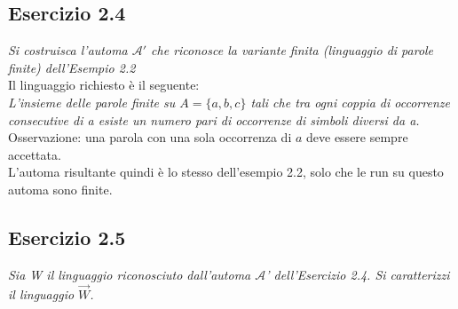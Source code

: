 \documentclass[12pt]{article}
\newcommand{\A}{\ensuremath{\mathcal{A}}\xspace}
\begin{document}
\subsection*{Esercizio 2.4}
\textit{Si costruisca l'automa $\A'$ che riconosce la variante finita (linguaggio di parole finite) dell'Esempio 2.2}\\
Il linguaggio richiesto è il seguente:\\
\textit{L'insieme delle parole finite su $A=\{a,b,c\}$ tali che tra ogni
coppia di occorrenze consecutive di a esiste un numero pari di occorrenze di simboli diversi da a.}\\
Osservazione: una parola con una sola occorrenza di $a$ deve essere sempre accettata.\\
L'automa risultante quindi è lo stesso dell'esempio 2.2, solo che le run su questo automa sono finite.
\begin{center}
\end{center}


\subsection*{Esercizio 2.5}
\textit{Sia W il linguaggio riconosciuto dall'automa \A' dell'Esercizio 2.4. Si caratterizzi il linguaggio $\overrightarrow{W}$.}
\end{document}
